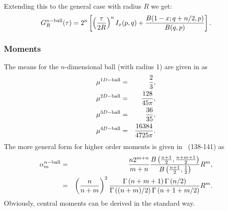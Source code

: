 Extending this to the general case with radius $R$ we get:
\begin{equation}
  \label{eq:cdf_n-ball}  
   G^{n-{\rm ball}}_{R}(\tau)
     =  2^n \left[ \left( \frac{\tau}{2R} \right)^{n} I_{x}(p,q)  + \frac{B(1-x; q+n/2,p)}{B(q,p)} \right].
\end{equation}

\subsubsection{Moments}

The means for the $n$-dimensional ball (with radius 1) are given in
\cite{weisstein:_ball_line_picking} as
\begin{eqnarray}
  \label{eq:ball-ndim-mean}
  \mu^{1D-{\rm ball}} & = & \frac{2}{3}, \\
  \mu^{2D-{\rm ball}} & = & \frac{128}{45 \pi},\\
  \mu^{3D-{\rm ball}} & = & \frac{36}{35}, \\
  \mu^{4D-{\rm ball}} & = & \frac{16384}{4725 \pi}.
\end{eqnarray}
The more general form for higher order moments is given in
\cite{tu00:_circle_line}~(138-141) as
\begin{eqnarray}
  \label{eq:ball-ndim-moments}
  \alpha_m^{n-{\rm ball}} & = &
     \frac{n 2^{m+n}}{m+n} \frac{B\left(\frac{n+1}{2}, \frac{n+m+1}{2}  \right)}{B\left(\frac{n+1}{2}, \frac{1}{2} \right)} R^m, \\
       & = & \left( \frac{n}{n+m} \right)^2 
                 \frac{\Gamma\left( n+m+1 \right) \Gamma\left( n/2 \right) }
                      {\Gamma\left( (n+m)/2 \right) \Gamma\left( n+1 + m/2 \right) } R^m.  
\end{eqnarray}
Obviously, central moments can be derived in the standard way.





